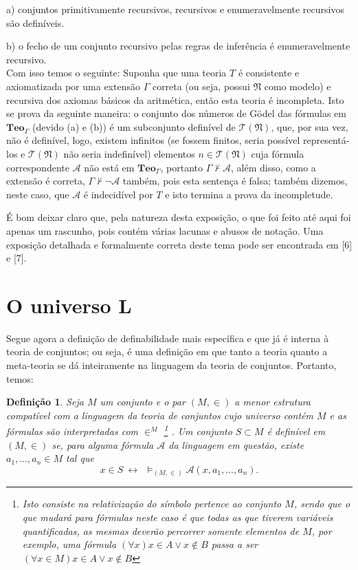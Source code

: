 \documentclass[11pt,a4paper]{article}
\newtheorem{mydef}{Definição}[section]
\theoremstyle{definition}
\begin{document}
a) conjuntos primitivamente recursivos, recursivos e enumeravelmente recursivos são definíveis.

b) o fecho de um conjunto recursivo pelas regras de inferência é enumeravelmente recursivo. \\

Com isso temos o seguinte: Suponha que uma teoria $T$ é consistente e axiomatizada por uma extensão $\Gamma$ correta (ou seja, possui $\mathfrak{N}$ como modelo) e recursiva dos axiomas básicos da aritmética, então esta teoria é incompleta. Isto se prova da seguinte maneira: o conjunto dos números de Gödel das fórmulas em $\textbf{Teo}_\Gamma$ (devido (a) e (b)) é um subconjunto definível de $\mathscr{T}(\mathfrak{N})$, que, por sua vez, não é definível, logo, existem infinitos (se fossem finitos, seria possível representá-los e $\mathscr{T}(\mathfrak{N})$ não seria indefinível) elementos $n\in \mathscr{T}(\mathfrak{N})$ cuja fórmula correspondente $\mathscr{A}$ não está em $\textbf{Teo}_\Gamma$, portanto $\Gamma \nvdash \mathscr{A}$, além disso, como a extensão é correta, $\Gamma \nvdash \neg \mathscr{A}$ também, pois esta sentença é falsa; também dizemos, neste caso, que $\mathscr{A}$ é indecidível por $T$ e isto termina a prova da incompletude. 

É bom deixar claro que, pela natureza desta exposição, o que foi feito até aqui foi apenas um rascunho, pois contém várias lacunas e abusos de notação. Uma exposição detalhada e formalmente correta deste tema pode ser encontrada em [6] e [7].

\section{O universo L}

Segue agora a definição de definabilidade mais específica e que já é interna à teoria de conjuntos; ou seja, é uma definição em que tanto a teoria quanto a meta-teoria se dá inteiramente na linguagem da teoria de conjuntos. Portanto, temos:   

\begin{mydef}
    
    Seja $M$ um conjunto e o par $(M,\in)$ a menor estrutura compatível com a linguagem da teoria de conjuntos cujo universo contém $M$ e as fórmulas são interpretadas com $\in^M$ \footnote{Isto consiste na relativização do símbolo pertence ao conjunto $M$, sendo que o que mudará para fórmulas neste caso é que todas as que tiverem variáveis quantificadas, as mesmas deverão percorrer somente elementos de $M$, por exemplo, uma fórmula $(\forall x)x\in A\vee x\notin B$ passa a ser $(\forall x\in M)x\in A\vee x\notin B$} . Um conjunto $S\subset M$ é definível em $(M,\in)$ se, para alguma fórmula $\mathscr{A}$ da linguagem em questão, existe $a_1,...,a_n\in M$ tal que $$x\in S \ \leftrightarrow \ \  \vDash_{(M,\in)} \mathscr{A}(x,a_1,...,a_n).$$
    
\end{mydef}
\end{document}
